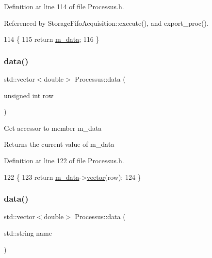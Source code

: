Definition at line 114 of file Processus.\+h.



Referenced by Storage\+Fifo\+Acquisition\+::execute(), and export\+\_\+proc().


\begin{DoxyCode}
114               \{
115     \textcolor{keywordflow}{return} \hyperlink{classProcessus_a3da9a9de8af54e2f47807a3e09dfccff}{m\_data};
116   \}
\end{DoxyCode}
\mbox{\label{classProcessus_aa7c57483cf4b9ab0b2d0ae2de8316402}} 
\subsubsection{\texorpdfstring{data()}{data()}\hspace{0.1cm}{\footnotesize\ttfamily [2/3]}}
{\footnotesize\ttfamily std\+::vector$<$double$>$ Processus\+::data (\begin{DoxyParamCaption}\item[{unsigned int}]{row }\end{DoxyParamCaption})\hspace{0.3cm}{\ttfamily [inline]}}

Get accessor to member m\+\_\+data \begin{DoxyReturn}{Returns}
the current value of m\+\_\+data 
\end{DoxyReturn}


Definition at line 122 of file Processus.\+h.


\begin{DoxyCode}
122                                           \{
123     \textcolor{keywordflow}{return} \hyperlink{classProcessus_a3da9a9de8af54e2f47807a3e09dfccff}{m\_data}->\hyperlink{classData_a94e00cdd58c1d6f11487f1ac47fee4bc}{vector}(row);
124   \}
\end{DoxyCode}
\mbox{\label{classProcessus_abf4d91fb36707e1d50178bab12d21ae9}} 
\subsubsection{\texorpdfstring{data()}{data()}\hspace{0.1cm}{\footnotesize\ttfamily [3/3]}}
{\footnotesize\ttfamily std\+::vector$<$double$>$ Processus\+::data (\begin{DoxyParamCaption}\item[{std\+::string}]{name }\end{DoxyParamCaption})\hspace{0.3cm}{\ttfamily [inline]}}

